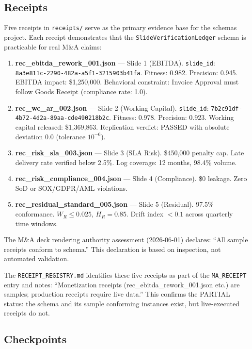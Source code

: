 \subsection{Receipts}
\label{sec:schemas-evidence-receipts}

Five receipts in \texttt{receipts/} serve as the primary evidence base for the schemas project.
Each receipt demonstrates that the \texttt{SlideVerificationLedger} schema is practicable for
real M\&A claims:

\begin{enumerate}
  \item \textbf{rec\_ebitda\_rework\_001.json} --- Slide 1 (EBITDA). \texttt{slide\_id}:
    \texttt{8a3e811c-2290-482a-a5f1-3215903b41fa}. Fitness: 0.982. Precision: 0.945.
    EBITDA impact: \$1,250,000. Behavioral constraint: Invoice Approval must follow Goods Receipt
    (compliance rate: 1.0).
  \item \textbf{rec\_wc\_ar\_002.json} --- Slide 2 (Working Capital). \texttt{slide\_id}:
    \texttt{7b2c91df-4b72-4d2a-89aa-cde490218b2c}. Fitness: 0.978. Precision: 0.923.
    Working capital released: \$1,369,863. Replication verdict: PASSED with absolute deviation
    $0.0$ (tolerance $10^{-6}$).
  \item \textbf{rec\_risk\_sla\_003.json} --- Slide 3 (SLA Risk). \$450,000 penalty cap.
    Late delivery rate verified below 2.5\%. Log coverage: 12 months, 98.4\% volume.
  \item \textbf{rec\_risk\_compliance\_004.json} --- Slide 4 (Compliance). \$0 leakage.
    Zero SoD or SOX/GDPR/AML violations.
  \item \textbf{rec\_residual\_standard\_005.json} --- Slide 5 (Residual). 97.5\% conformance.
    $W_R \le 0.025$, $H_R = 0.85$. Drift index $< 0.1$ across quarterly time windows.
\end{enumerate}

The M\&A deck rendering authority assessment (2026-06-01) declares: ``All sample receipts conform
to schema.'' This declaration is based on inspection, not automated validation.

The \texttt{RECEIPT\_REGISTRY.md} identifies these five receipts as part of the \texttt{MA\_RECEIPT}
entry and notes: ``Monetization receipts (rec\_ebitda\_rework\_001.json etc.) are samples;
production receipts require live data.'' This confirms the PARTIAL status: the schema and its
sample conforming instances exist, but live-executed receipts do not.

\subsection{Checkpoints}
\label{sec:schemas-evidence-checkpoints}

